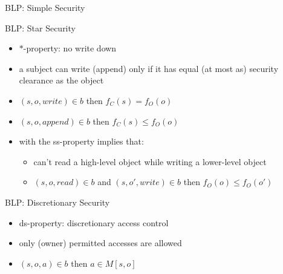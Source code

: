 \documentclass{beamer}
\begin{document}
\begin{frame}{BLP: Simple Security}
\begin{center}
{  }
  \end{center}
\end{frame}

\begin{frame}{BLP: Star Security}
  \begin{itemize}
  \item $*$-property: no write down
  \item a subject can write (append) only if it has equal (at most as)  security
    clearance as the object
  \item $(s, o, write) \in b$ then
    $f_C(s) = f_O(o)$
  \item $(s, o, append) \in b$ then
    $f_C(s) \leq f_O(o)$
  \item<2-> with the ss-property implies that:
    \begin{itemize}
      \item can't read a high-level object while writing a lower-level
        object
      \item $(s, o, read) \in b$ and $(s, o', write) \in b$ then
        $f_O(o) \leq f_O(o')$
    \end{itemize}
  \end{itemize}
\end{frame}

\begin{frame}{BLP: Discretionary Security}
  \begin{itemize}
  \item ds-property: discretionary access control
  \item only (owner) permitted accesses are allowed
  \item $(s, o, a) \in b$ then
    $a \in M[s, o]$
  \end{itemize}
\end{frame}
\end{document}
